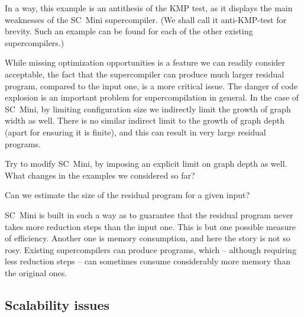 In a way, this example is an antithesis of the KMP test, as it displays the
main weaknesses of the SC~Mini supercompiler.
(We shall call it anti-KMP-test for brevity. Such an example can be found for 
each of the other existing supercompilers.)

While missing optimization opportunities is a feature we can readily consider acceptable,
the fact that the supercompiler can produce much larger residual program, compared to
the input one, is a more critical issue.
The danger of code explosion is an important problem for supercompilation in general.
In the case of SC~Mini, by limiting configuration size we indirectly limit
the growth of graph width as well. 
There is no similar indirect limit
to the growth of graph depth (apart for ensuring it is finite),
and this can result in very large residual programs.

\begin{exercise}
Try to modify SC~Mini, by imposing an explicit limit on graph depth as well. 
What changes in the examples we considered so far?
\end{exercise}

\begin{exercise}
Can we estimate the size of the residual program for a given input?
\end{exercise}



SC~Mini is built in such a way as to guarantee that the residual program never takes more 
reduction steps than the input one. This is but one possible measure of efficiency.
Another one is memory consumption, and here the story is not so rosy.
Existing supercompilers can produce programs, which -- although requiring
less reduction steps -- can sometimes consume considerably more memory 
than the original ones.

\subsection{Scalability issues}

